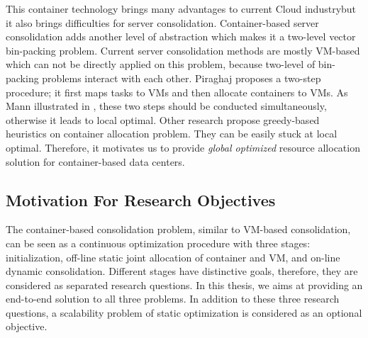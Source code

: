 
This container technology brings many advantages to current Cloud industry\cite{Felter:2015ki}but it also brings difficulties for server consolidation. Container-based server consolidation adds another level of abstraction which makes it a two-level vector bin-packing problem. Current server consolidation methods are mostly VM-based which can not be directly applied on this problem, because two-level of bin-packing problems interact with each other. Piraghaj \cite{Piraghaj:2016bw} proposes a two-step procedure; it first maps tasks to VMs and then allocate containers to VMs. As Mann illustrated in \cite{Mann:2016hx},  these two steps should be conducted simultaneously, otherwise it leads to local optimal. Other research \cite{Dong:2014iz, Hindman:2011ux, Anselmi:2008ik} propose greedy-based heuristics on container allocation problem. They can be easily stuck at local optimal. 
Therefore, it motivates us to provide \emph{global optimized} resource allocation solution for container-based data centers.



\subsection{Motivation For Research Objectives}
The container-based consolidation problem, similar to VM-based consolidation, can be seen as 
a continuous optimization procedure with three stages: initialization, off-line static joint allocation of container and VM, and on-line dynamic consolidation. Different stages have distinctive goals, therefore, they are considered as separated research questions. In this thesis, we aims at providing an end-to-end solution to all three problems. In addition to these three research questions, a scalability problem of static optimization is considered as an optional objective.

